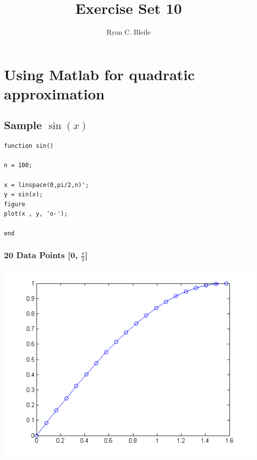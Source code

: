 \documentclass[12pt]{article}
\title{Exercise Set 10}
\author{Ryan C. Bleile}
\begin{document}
\maketitle
\newpage

\section*{Using Matlab for quadratic approximation}
\subsection*{Sample $\sin(x)$}

\begin{verbatim}
function sin()

n = 100;

x = linspace(0,pi/2,n)';
y = sin(x);
figure
plot(x , y, 'o-');

end
\end{verbatim}

\subsubsection*{20 Data Points [0, $\frac{\pi}{2}$]}
\includegraphics[scale=.5]{plot5.png}
\end{document}
